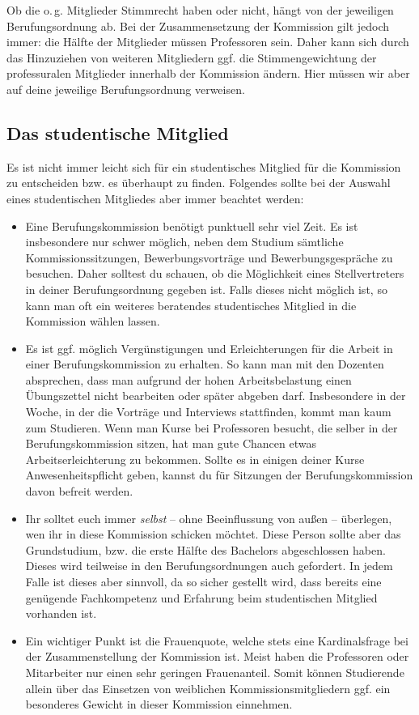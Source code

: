 Ob die o.\,g. Mitglieder Stimmrecht haben oder nicht, hängt von der jeweiligen Berufungsordnung ab. Bei der Zusammensetzung der Kommission gilt jedoch immer: die Hälfte der Mitglieder müssen Professoren sein. Daher kann sich durch das Hinzuziehen von weiteren Mitgliedern ggf. die Stimmengewichtung der professuralen Mitglieder innerhalb der Kommission ändern. Hier müssen wir aber auf deine jeweilige Berufungsordnung verweisen.

\subsection{Das studentische Mitglied}
Es ist nicht immer leicht sich für ein studentisches Mitglied für die Kommission zu entscheiden bzw. es überhaupt zu finden. Folgendes sollte bei der Auswahl eines studentischen Mitgliedes aber immer beachtet werden:
\begin{itemize}
    \item Eine Berufungskommission benötigt punktuell sehr viel Zeit. Es ist insbesondere nur schwer möglich, neben dem Studium sämtliche Kommissionssitzungen, Bewerbungsvorträge und Bewerbungsgespräche zu besuchen. Daher solltest du schauen, ob die Möglichkeit eines Stellvertreters in deiner Berufungsordnung gegeben ist. Falls dieses nicht möglich ist, so kann man oft ein weiteres beratendes studentisches Mitglied in die Kommission wählen lassen.

    \item Es ist ggf. möglich Vergünstigungen und Erleichterungen für die Arbeit in einer Berufungskommission zu erhalten. So kann man mit den Dozenten absprechen, dass man aufgrund der hohen Arbeitsbelastung einen Übungszettel nicht bearbeiten oder später abgeben darf. Insbesondere in der Woche, in der die Vorträge und Interviews stattfinden, kommt man kaum zum Studieren. Wenn man Kurse bei Professoren besucht, die selber in der Berufungskommission sitzen, hat man gute Chancen etwas Arbeitserleichterung zu bekommen. Sollte es in einigen deiner Kurse Anwesenheitspflicht geben, kannst du für Sitzungen der Berufungskommission davon befreit werden.

    \item Ihr solltet euch immer \emph{selbst} -- ohne Beeinflussung von außen -- überlegen, wen ihr in diese Kommission schicken möchtet. Diese Person sollte aber das Grundstudium, bzw. die erste Hälfte des Bachelors abgeschlossen haben. Dieses wird teilweise in den Berufungsordnungen auch gefordert. In jedem Falle ist dieses aber sinnvoll, da so sicher gestellt wird, dass bereits eine genügende Fachkompetenz und Erfahrung beim studentischen Mitglied vorhanden ist.

    \item Ein wichtiger Punkt ist die Frauenquote, welche stets eine Kardinalsfrage bei der Zusammenstellung der Kommission ist. Meist haben die Professoren oder Mitarbeiter nur einen sehr geringen Frauenanteil. Somit können Studierende allein über das Einsetzen von weiblichen Kommissionsmitgliedern ggf. ein besonderes Gewicht in dieser Kommission einnehmen.
\end{itemize}

